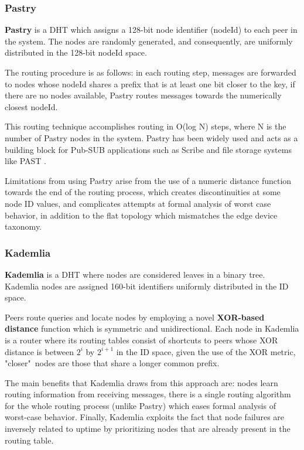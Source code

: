 \subsubsection*{Pastry}

\textbf{Pastry} \cite{rowstron2001pastry} is a DHT which assigns a 128-bit node identifier (nodeId) to each peer in the system. The nodes are randomly generated, and consequently, are uniformly distributed in the 128-bit nodeId space. 

The routing procedure is as follows: in each routing step, messages are forwarded to nodes whose nodeId shares a prefix that is at least one bit closer to the key, if there are no nodes available, Pastry routes messages towards the numerically closest nodeId. 

This routing technique accomplishes routing in O(log N) steps, where N is the number of Pastry nodes in the system. Pastry has been widely used and acts as a building block for Pub-SUB applications such as Scribe \cite{10.1007/3-540-45546-9_3} and file storage systems like PAST \cite{990064}. 

Limitations from using Pastry arise from the use of a numeric distance function towards the end of the routing process, which creates discontinuities at some node ID values, and complicates attempts at formal analysis of worst case behavior, in addition to the flat topology which mismatches the edge device taxonomy.

\subsubsection*{Kademlia}

\textbf{Kademlia} \cite{maymounkov2002kademlia} is a DHT where nodes are considered leaves in a binary tree. Kademlia nodes are assigned 160-bit identifiers uniformly distributed in the ID space.

Peers route queries and locate nodes by employing a novel \textbf{XOR-based distance} function which is symmetric and unidirectional. Each node in Kademlia is a router where its routing tables consist of shortcuts to peers whose XOR distance is between \(2^{i}\) by \(2^{i + 1}\) in the ID space, given the use of the XOR metric, "closer"\ nodes are those that share a longer common prefix.

The main benefits that Kademlia draws from this approach are: nodes learn routing information from receiving messages, there is a single routing algorithm for the whole routing process (unlike Pastry) which eases formal analysis of worst-case behavior. Finally, Kademlia exploits the fact that node failures are inversely related to uptime by prioritizing nodes that are already present in the routing table.

